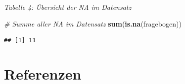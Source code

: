 \documentclass[]{article}
\newenvironment{Shaded}{\begin{snugshade}}{\end{snugshade}}
\newcommand{\KeywordTok}[1]{\textcolor[rgb]{0.13,0.29,0.53}{\textbf{{#1}}}}
\newcommand{\CommentTok}[1]{\textcolor[rgb]{0.56,0.35,0.01}{\textit{{#1}}}}
\newcommand{\NormalTok}[1]{{#1}}
\begin{document}
\begin{center}
\textit{Tabelle 4: Übersicht der NA im Datensatz}
\bigskip
\end{center}

\begin{Shaded}
\begin{Highlighting}[]
\CommentTok{# Summe aller NA im Datensatz}
\KeywordTok{sum}\NormalTok{(}\KeywordTok{is.na}\NormalTok{(fragebogen))}
\end{Highlighting}
\end{Shaded}

\begin{verbatim}
## [1] 11
\end{verbatim}

\section{Referenzen}

\appendix
\end{document}

